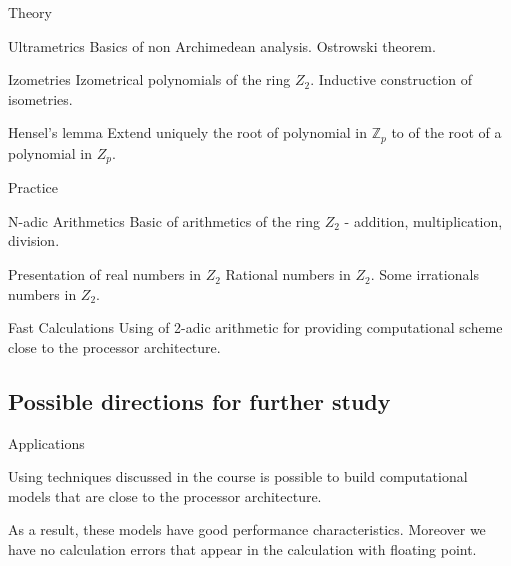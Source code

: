 \begin{frame}{Theory}
\pause
\begin{block}{Ultrametrics}
\pause
Basics of non Archimedean analysis. Ostrowski theorem.

\end{block}
\pause

\begin{block}{Izometries}
\pause
Izometrical polynomials of the ring $Z_2$. Inductive construction of isometries.
\end{block}
\pause
\begin{block}{Hensel's lemma}
\pause
Extend uniquely the root of polynomial in $\mathbb{Z}_p$ to of the root of a polynomial in $Z_p$.
\end{block}


\end{frame}



\begin{frame}{Practice}
\pause
\begin{block}{N-adic Arithmetics}
\pause
Basic of arithmetics of the ring $Z_2$ - addition, multiplication, division. 

\end{block}
\pause
\begin{block}{Presentation of real numbers in $Z_2$}
\pause
Rational numbers in $Z_2$. Some irrationals numbers in $Z_2$.
\end{block}
\pause
\begin{block}{Fast Calculations}
\pause
Using of 2-adic arithmetic for providing computational scheme close to the processor architecture.

\end{block}


\end{frame}
\subsection{Possible directions for further study}

\begin{frame}{Applications}

Using techniques discussed in the course is possible to build computational models that are close to the processor architecture.
\pause

 As a result, these models have good performance characteristics. Moreover we have no calculation errors that appear in the calculation with floating point.

\end{frame}



